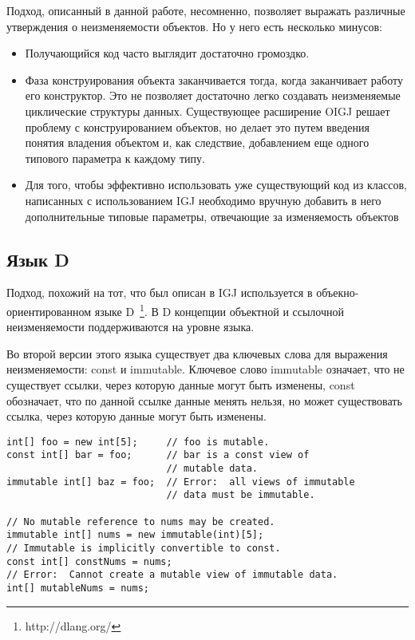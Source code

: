 Подход, описанный в данной работе, несомненно, позволяет выражать различные утверждения о неизменяемости объектов. Но у него есть несколько минусов:
\begin{itemize}
\item Получающийся код часто выглядит достаточно громоздко.
\item Фаза конструирования объекта заканчивается тогда, когда заканчивает работу его конструктор. Это не позволяет достаточно легко создавать неизменяемые циклические структуры данных. Существующее расширение OIGJ \cite{Potanin} решает проблему с конструированием объектов, но делает это путем введения понятия владения объектом и, как следствие, добавлением еще одного типового параметра к каждому типу. 
\item Для того, чтобы эффективно использовать уже существующий код из классов, написанных с использованием IGJ необходимо вручную добавить в него дополнительные типовые параметры, отвечающие за изменяемость объектов
\end{itemize}

\subsection{Язык D}

Подход, похожий на тот, что был описан в IGJ используется в объекно-ориентированном языке D~\footnote{http://dlang.org/}. В D концепции объектной и ссылочной неизменяемости поддерживаются на уровне языка.

Во второй версии этого языка существует два ключевых слова для выражения неизменяемости: const и immutable. Ключевое слово immutable означает, что не существует ссылки, через которую данные могут быть изменены, const обозначает, что по данной ссылке данные менять нельзя, но может существовать ссылка, через которую данные могут быть изменены. 

\begin{lstlisting}[caption=const vs immutable, label=code:d_const_vs_immutable]
int[] foo = new int[5];     // foo is mutable.
const int[] bar = foo;      // bar is a const view of 
                            // mutable data.
immutable int[] baz = foo;  // Error:  all views of immutable 
                            // data must be immutable.
 
// No mutable reference to nums may be created.
immutable int[] nums = new immutable(int)[5]; 
// Immutable is implicitly convertible to const.
const int[] constNums = nums;         
// Error:  Cannot create a mutable view of immutable data.         
int[] mutableNums = nums;                      
\end{lstlisting}

